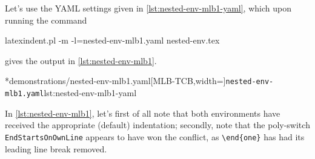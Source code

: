 	Let's use the YAML settings given in \cref{lst:nested-env-mlb1-yaml}, which upon running
	the command
	\begin{commandshell}
latexindent.pl -m -l=nested-env-mlb1.yaml nested-env.tex
\end{commandshell}
	gives the output in \cref{lst:nested-env-mlb1}.

	\begin{cmhtcbraster}[raster column skip=.05\linewidth]
		\cmhlistingsfromfile[style=yaml-LST]*{demonstrations/nested-env-mlb1.yaml}[MLB-TCB,width=\linewidth]{\texttt{nested-env-mlb1.yaml}}{lst:nested-env-mlb1-yaml}
	\end{cmhtcbraster}

	In \cref{lst:nested-env-mlb1}, let's first of all note that both environments have
	received the appropriate (default) indentation; secondly, note that the poly-switch
	\texttt{EndStartsOnOwnLine} appears to have won the conflict, as \lstinline!\end{one}!
	has had its leading line break removed.

